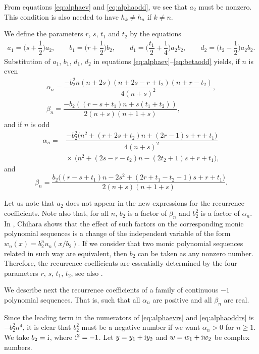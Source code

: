 \documentclass[10pt,a4paper]{amsart}
\numberwithin{equation}{section}
\begin{document}
From equations \eqref{eq:alphaev} and \eqref{eq:alphaodd}, we see that $a_2$ must be nonzero. This condition is also needed to have $h_k \ne h_n$ if $ k \ne n$.

We define the parameters $r$, $s$, $t_1$ and $t_2$ by the equations
\begin{gather*}
a_1=\biggl(s + \dfrac{1}{2}\biggr) a_2,\qquad b_1=\biggl(r+\dfrac{1}{2}\biggr) b_2,\qquad d_1=\biggl(\dfrac{t_1}{2} +\dfrac{1}{4}\biggr) a_2 b_2, \qquad d_2=\biggl( t_2- \dfrac{1}{2}\biggr) a_2 b_2.
\end{gather*}
Substitution of $a_1$, $b_1$, $d_1$, $d_2$ in equations \eqref{eq:alphaev}--\eqref{eq:betaodd} yields, if $n$ is even
\begin{gather}
\alpha_n = \dfrac{-b_2^2n ( n+ 2 s) ( n+ 2 s -r + t_2) ( n+ r - t_2)}{4 (n+s)^2},\\
	\beta_n =\dfrac{-b_2((r-s+t_1) n +s (t_1+t_2))}{2 (n+s)(n+1+s)},\label{eq:alphaevrs}
\end{gather}
 and if $n$ is odd
\begin{align}
\alpha_n ={}& \dfrac{-b_2^2\bigl(n^2+(r+2s+t_2) n + (2 r -1)s + r + t_1\bigr)}{4(n+s)^2} \\
 	 &{}{\times} \, \bigl(n^2+(2s -r - t_2) n -(2 t_2 + 1)s + r + t_1\bigr),\label{eq:alphaoddrs}
\end{align}
and
\begin{equation}\label{eq:betaoddrs}
	\beta_n= \dfrac{b_2\bigl((r-s+t_1) n -2 s^2 +( 2r +t_1 - t_2-1)s + r + t_1\bigr)}{2(n+s)( n+1+s)}.
\end{equation}

Let us note that $a_2$ does not appear in the new expressions for the recurrence coefficients. Note also that, for all $n$, $b_2$ is a factor of $\beta_n$ and $b_2^2$ is a factor of $\alpha_n$. In \cite[Appendix, p.~215]{Chi}, Chihara shows that the effect of such factors on the corresponding monic polynomial sequences is a change of the independent variable of the form $w_n(x)=b_2^n u_n(x/b_2)$. If we consider that two monic polynomial sequences related in such way are equivalent, then $b_2$ can be taken as any nonzero number. Therefore, the recurrence coefficients are essentially determined by the four parameters $r$, $s$, $t_1$, $t_2$, see also \cite[Remark~2.5]{K3}.

We describe next the recurrence coefficients of a family of continuous $-1$ polynomial sequences. That is, such that all $\alpha_n$ are positive and all $\beta_n$ are real.


Since the leading term in the numerators of \eqref{eq:alphaevrs} and \eqref{eq:alphaoddrs} is $- b_2^2 n^4$, it is clear that $b_2^2$ must be a negative number if we want $\alpha_n >0$ for $n\ge 1$. We take $b_2={\rm i}$, where ${\rm i}^2=-1$.
Let $y=y_1 + {\rm i} y_2$ and $w=w_1 + {\rm i} w_2$ be complex numbers.
\end{document}
